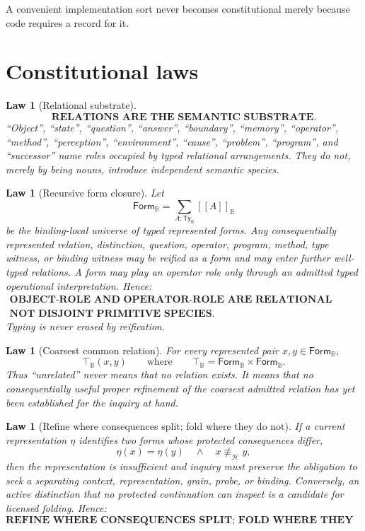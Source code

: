 \documentclass[11pt,oneside]{article}
\newtheorem{law}[definition]{Law}
\newcommand{\B}{\mathbb B}
\newcommand{\den}[1]{[\![#1]\!]}
\begin{document}
A convenient implementation sort never becomes constitutional merely because code requires a record for it.

\section{Constitutional laws}

\begin{law}[Relational substrate]
\[
\boxed{\textbf{RELATIONS ARE THE SEMANTIC SUBSTRATE.}}
\]
``Object'', ``state'', ``question'', ``answer'', ``boundary'', ``memory'', ``operator'', ``method'', ``perception'', ``environment'', ``cause'', ``problem'', ``program'', and ``successor'' name roles occupied by typed relational arrangements.  They do not, merely by being nouns, introduce independent semantic species.
\end{law}


\begin{law}[Recursive form closure]
Let
\[
\mathsf{Form}_{\B}
=
\sum_{A:\mathsf{Ty}_{\B}}\den{A}_{\B}
\]
be the binding-local universe of typed represented forms.  Any consequentially represented relation, distinction, question, operator, program, method, type witness, or binding witness may be reified as a form and may enter further well-typed relations.  A form may play an operator role only through an admitted typed operational interpretation.  Hence:
\[
\boxed{
\begin{gathered}
\textbf{OBJECT-ROLE AND OPERATOR-ROLE ARE RELATIONAL ROLES,}\\
\textbf{NOT DISJOINT PRIMITIVE SPECIES.}
\end{gathered}}
\]
Typing is never erased by reification.
\end{law}

\begin{law}[Coarsest common relation]
For every represented pair \(x,y\in\mathsf{Form}_{\B}\),
\[
\boxed{\top_{\B}(x,y)}
\qquad\text{where}\qquad
\top_{\B}=\mathsf{Form}_{\B}\times\mathsf{Form}_{\B}.
\]
Thus ``unrelated'' never means that no relation exists.  It means that no consequentially useful proper refinement of the coarsest admitted relation has yet been established for the inquiry at hand.
\end{law}

\begin{law}[Refine where consequences split; fold where they do not]
If a current representation \(\eta\) identifies two forms whose protected consequences differ,
\[
\eta(x)=\eta(y)
\quad\land\quad
x\not\equiv_{\mathcal H}y,
\]
then the representation is insufficient and inquiry must preserve the obligation to seek a separating context, representation, grain, probe, or binding.  Conversely, an active distinction that no protected continuation can inspect is a candidate for licensed folding.  Hence:
\[
\boxed{\textbf{REFINE WHERE CONSEQUENCES SPLIT; FOLD WHERE THEY DO NOT.}}
\]
\end{law}
\end{document}
